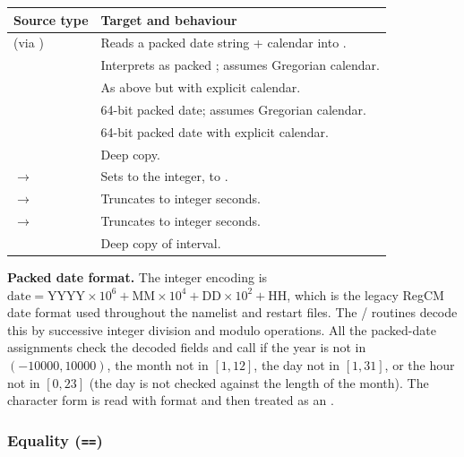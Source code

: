 \begin{longtable}{L{5cm} L{9cm}}
  \toprule
  \textbf{Source type} & \textbf{Target and behaviour} \\
  \midrule
  \endhead
  \bottomrule
  \endfoot
   (via )  &
    Reads a packed date string + calendar into . \\
   &
    Interprets as packed ; assumes Gregorian calendar. \\
   &
    As above but with explicit calendar. \\
   &
    64-bit packed date; assumes Gregorian calendar. \\
   &
    64-bit packed date with explicit calendar. \\
   &
    Deep copy. \\
   $\to$  &
    Sets  to the integer,  to . \\
   $\to$  &
    Truncates to integer seconds. \\
   $\to$  &
    Truncates to integer seconds. \\
   &
    Deep copy of interval. \\
\end{longtable}

\textbf{Packed date format.} The integer encoding is
$\text{date} = \text{YYYY} \times 10^6 + \text{MM} \times 10^4
             + \text{DD} \times 10^2 + \text{HH}$,
which is the legacy RegCM date format used throughout the namelist and
restart files. The  /  routines decode
this by successive integer division and modulo operations. All the
packed-date assignments check the decoded fields and call  if the
year is not in $(-10000, 10000)$, the month not in $[1,12]$, the day not in
$[1,31]$, or the hour not in $[0,23]$ (the day is not checked against the
length of the month). The character form is read with format 
and then treated as an .

\subsubsection{Equality (\texttt{==})}

